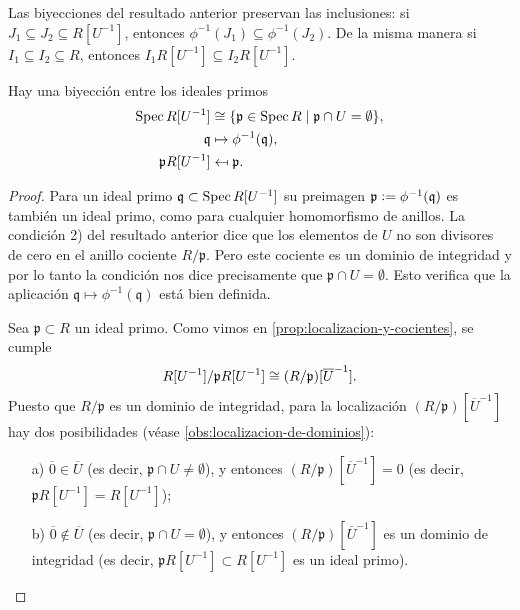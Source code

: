 \begin{comentario}
  Las biyecciones del resultado anterior preservan las inclusiones:
  si $J_1 \subseteq J_2 \subseteq R [U^{-1}]$, entonces
  $\phi^{-1} (J_1) \subseteq \phi^{-1} (J_2)$. De la misma manera
  si $I_1 \subseteq I_2 \subseteq R$, entonces
  $I_1 R [U^{-1}] \subseteq I_2 R [U^{-1}]$.
\end{comentario}

\begin{corolario}
  Hay una biyección entre los ideales primos
  \begin{align*}
    \operatorname{Spec} R [U^{-1}] & \cong
    \{ \mathfrak{p} \in \operatorname{Spec} R \mid \mathfrak{p} \cap U = \emptyset \},\\
    \mathfrak{q} & \mapsto \phi^{-1} (\mathfrak{q}),\\
    \mathfrak{p} R [U^{-1}] & \mapsfrom \mathfrak{p}.
  \end{align*}

  \begin{proof}
    Para un ideal primo $\mathfrak{q} \subset \operatorname{Spec} R [U^{-1}]$ su preimagen
    $\mathfrak{p} \mathrel{\mathop:}= \phi^{-1} (\mathfrak{q})$ es también un ideal primo, como
    para cualquier homomorfismo de anillos. La condición 2) del resultado
    anterior dice que los elementos de $U$ no son divisores de cero en el anillo
    cociente $R/\mathfrak{p}$. Pero este cociente es un dominio de integridad y
    por lo tanto la condición nos dice precisamente que
    $\mathfrak{p} \cap U = \emptyset$. Esto verifica que la aplicación
    $\mathfrak{q} \mapsto \phi^{-1} (\mathfrak{q})$ está bien definida.

    Sea $\mathfrak{p} \subset R$ un ideal primo. Como vimos
    en \ref{prop:localizacion-y-cocientes}, se cumple
    $$R [U^{-1}] / \mathfrak{p} R [U^{-1}] \cong (R/\mathfrak{p}) [\overline{U}^{-1}].$$
    Puesto que $R/\mathfrak{p}$ es un dominio de integridad, para
    la localización $(R/\mathfrak{p}) [\overline{U}^{-1}]$ hay dos posibilidades
    (véase \ref{obs:localizacion-de-dominios}):

    \begin{enumerate}
    \item[a)] $\overline{0} \in \overline{U}$
      (es decir, $\mathfrak{p} \cap U \ne \emptyset$), y entonces
      $(R/\mathfrak{p}) [\overline{U}^{-1}] = 0$
      (es decir, $\mathfrak{p} R [U^{-1}] = R [U^{-1}]$);

    \item[b)] $\overline{0} \notin \overline{U}$
      (es decir, $\mathfrak{p} \cap U = \emptyset$), y entonces
      $(R/\mathfrak{p}) [\overline{U}^{-1}]$ es un dominio de integridad
      (es decir, $\mathfrak{p} R [U^{-1}] \subset R [U^{-1}]$ es un ideal
      primo).
    \end{enumerate}


\end{proof}
\end{corolario}
